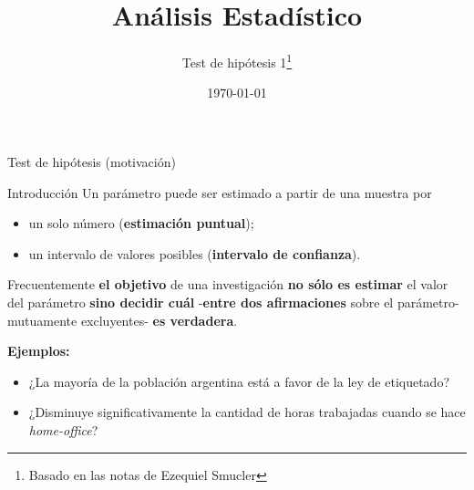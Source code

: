\documentclass{beamer}
\theoremstyle{definition}
\begin{document}
\title{\color{rosee}An\'alisis Estad\'istico}
\subtitle{\color{rosee}Test de hip\'otesis 1\footnote{Basado en las notas de Ezequiel Smucler}}

\date{\today}

\begin{frame}
  \maketitle
\end{frame}

\begin{frame}{\color{rosee}Test de hip\'otesis (motivación)} \small
  \begin{block}{Introducci\'on}
    Un par\'ametro puede ser estimado a partir de una muestra por
    \begin{itemize}
    \item un solo n\'umero (\textbf{estimaci\'on puntual});
    \item un intervalo de valores posibles (\textbf{intervalo de confianza}).
    \end{itemize}
    Frecuentemente \textbf{el objetivo} de una investigaci\'on \textbf{no s\'olo es estimar} el
    valor del par\'ametro \textbf{sino decidir cu\'al} -\textbf{entre dos afirmaciones} sobre el par\'ametro- mutuamente excluyentes- \textbf{es verdadera}.
  \end{block}
\textbf{Ejemplos:}
    \begin{itemize}[leftmargin=*]
    \item ¿La mayoría de la población argentina está a favor de la ley de etiquetado?\medskip %
    \item ¿Disminuye significativamente la cantidad de horas trabajadas cuando se hace \textit{home-office}? %
\end{itemize}
   
\end{frame}
\end{document}
